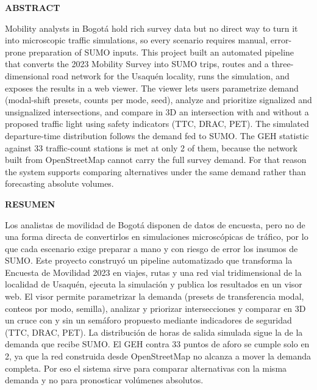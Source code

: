 \begin{center}
    \textbf{ABSTRACT}
\end{center}

\vspace{0.25cm}

Mobility analysts in Bogot\'a hold rich survey data but no direct way to turn it into microscopic traffic simulations, so every scenario requires manual, error-prone preparation of SUMO inputs. This project built an automated pipeline that converts the 2023 Mobility Survey into SUMO trips, routes and a three-dimensional road network for the Usaqu\'en locality, runs the simulation, and exposes the results in a web viewer. The viewer lets users parametrize demand (modal-shift presets, counts per mode, seed), analyze and prioritize signalized and unsignalized intersections, and compare in 3D an intersection with and without a proposed traffic light using safety indicators (TTC, DRAC, PET). The simulated departure-time distribution follows the demand fed to SUMO. The GEH statistic against 33 traffic-count stations is met at only 2 of them, because the network built from OpenStreetMap cannot carry the full survey demand. For that reason the system supports comparing alternatives under the same demand rather than forecasting absolute volumes.

\vspace{0.5cm}

\begin{center}
    {\textbf{RESUMEN}}
\end{center}

\vspace{0.25cm}

Los analistas de movilidad de Bogot\'a disponen de datos de encuesta, pero no de una forma directa de convertirlos en simulaciones microsc\'opicas de tr\'afico, por lo que cada escenario exige preparar a mano y con riesgo de error los insumos de SUMO. Este proyecto construy\'o un pipeline automatizado que transforma la Encuesta de Movilidad 2023 en viajes, rutas y una red vial tridimensional de la localidad de Usaqu\'en, ejecuta la simulaci\'on y publica los resultados en un visor web. El visor permite parametrizar la demanda (presets de transferencia modal, conteos por modo, semilla), analizar y priorizar intersecciones y comparar en 3D un cruce con y sin un sem\'aforo propuesto mediante indicadores de seguridad (TTC, DRAC, PET). La distribuci\'on de horas de salida simulada sigue la de la demanda que recibe SUMO. El GEH contra 33 puntos de aforo se cumple solo en 2, ya que la red construida desde OpenStreetMap no alcanza a mover la demanda completa. Por eso el sistema sirve para comparar alternativas con la misma demanda y no para pronosticar vol\'umenes absolutos.
